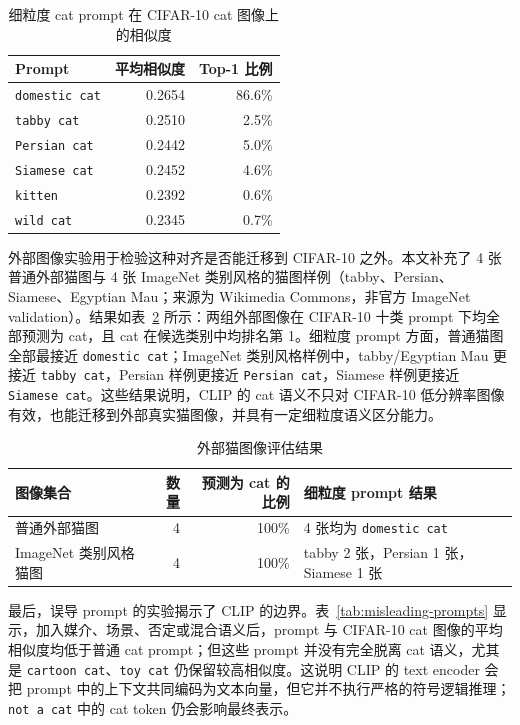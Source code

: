 \documentclass[12pt,a4paper]{ctexart}
\begin{document}
\begin{table}[H]
\centering
\caption{细粒度 cat prompt 在 CIFAR-10 cat 图像上的相似度}
\label{tab:fine-cat-prompts}
\begin{tabular}{lrr}
\toprule
Prompt & 平均相似度 & Top-1 比例 \\
\midrule
\texttt{domestic cat} & 0.2654 & 86.6\% \\
\texttt{tabby cat}   & 0.2510 & 2.5\% \\
\texttt{Persian cat} & 0.2442 & 5.0\% \\
\texttt{Siamese cat} & 0.2452 & 4.6\% \\
\texttt{kitten}      & 0.2392 & 0.6\% \\
\texttt{wild cat}    & 0.2345 & 0.7\% \\
\bottomrule
\end{tabular}
\end{table}

外部图像实验用于检验这种对齐是否能迁移到 CIFAR-10 之外。本文补充了 4 张普通外部猫图与 4 张 ImageNet 类别风格的猫图样例（tabby、Persian、Siamese、Egyptian Mau；来源为 Wikimedia Commons，非官方 ImageNet validation）。结果如表~\ref{tab:external-cats} 所示：两组外部图像在 CIFAR-10 十类 prompt 下均全部预测为 cat，且 cat 在候选类别中均排名第 1。细粒度 prompt 方面，普通猫图全部最接近 \texttt{domestic cat}；ImageNet 类别风格样例中，tabby/Egyptian Mau 更接近 \texttt{tabby cat}，Persian 样例更接近 \texttt{Persian cat}，Siamese 样例更接近 \texttt{Siamese cat}。这些结果说明，CLIP 的 cat 语义不只对 CIFAR-10 低分辨率图像有效，也能迁移到外部真实猫图像，并具有一定细粒度语义区分能力。

\begin{table}[H]
\centering
\caption{外部猫图像评估结果}
\label{tab:external-cats}
\begin{tabular}{lrrl}
\toprule
图像集合 & 数量 & 预测为 cat 的比例 & 细粒度 prompt 结果 \\
\midrule
普通外部猫图 & 4 & 100\% & 4 张均为 \texttt{domestic cat} \\
ImageNet 类别风格猫图 & 4 & 100\% & tabby 2 张，Persian 1 张，Siamese 1 张 \\
\bottomrule
\end{tabular}
\end{table}

最后，误导 prompt 的实验揭示了 CLIP 的边界。表~\ref{tab:misleading-prompts} 显示，加入媒介、场景、否定或混合语义后，prompt 与 CIFAR-10 cat 图像的平均相似度均低于普通 cat prompt；但这些 prompt 并没有完全脱离 cat 语义，尤其是 \texttt{cartoon cat}、\texttt{toy cat} 仍保留较高相似度。这说明 CLIP 的 text encoder 会把 prompt 中的上下文共同编码为文本向量，但它并不执行严格的符号逻辑推理；\texttt{not a cat} 中的 cat token 仍会影响最终表示。
\end{document}
